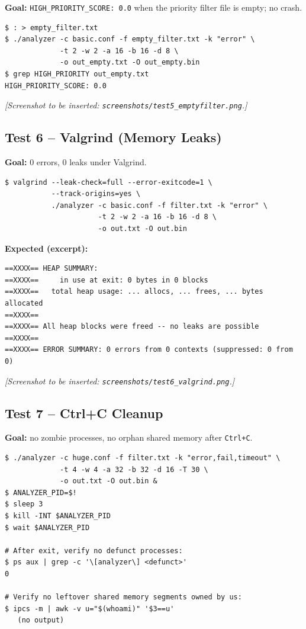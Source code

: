 \documentclass[11pt,a4paper]{article}
\newcommand{\code}[1]{\texttt{\small #1}}
\begin{document}
\textbf{Goal:} \code{HIGH\_PRIORITY\_SCORE: 0.0} when the priority
filter file is empty; no crash.

\begin{lstlisting}[style=Bashstyle]
$ : > empty_filter.txt
$ ./analyzer -c basic.conf -f empty_filter.txt -k "error" \
             -t 2 -w 2 -a 16 -b 16 -d 8 \
             -o out_empty.txt -O out_empty.bin
$ grep HIGH_PRIORITY out_empty.txt
HIGH_PRIORITY_SCORE: 0.0
\end{lstlisting}

\noindent
\textit{[Screenshot to be inserted: \code{screenshots/test5\_emptyfilter.png}.]}

\subsection{Test 6 -- Valgrind (Memory Leaks)}

\textbf{Goal:} 0 errors, 0 leaks under Valgrind.

\begin{lstlisting}[style=Bashstyle]
$ valgrind --leak-check=full --error-exitcode=1 \
           --track-origins=yes \
           ./analyzer -c basic.conf -f filter.txt -k "error" \
                      -t 2 -w 2 -a 16 -b 16 -d 8 \
                      -o out.txt -O out.bin
\end{lstlisting}

\textbf{Expected (excerpt):}
\begin{lstlisting}[style=Outputstyle]
==XXXX== HEAP SUMMARY:
==XXXX==     in use at exit: 0 bytes in 0 blocks
==XXXX==   total heap usage: ... allocs, ... frees, ... bytes allocated
==XXXX==
==XXXX== All heap blocks were freed -- no leaks are possible
==XXXX==
==XXXX== ERROR SUMMARY: 0 errors from 0 contexts (suppressed: 0 from 0)
\end{lstlisting}

\noindent
\textit{[Screenshot to be inserted: \code{screenshots/test6\_valgrind.png}.]}

\subsection{Test 7 -- Ctrl+C Cleanup}

\textbf{Goal:} no zombie processes, no orphan shared memory after
\code{Ctrl+C}.

\begin{lstlisting}[style=Bashstyle]
$ ./analyzer -c huge.conf -f filter.txt -k "error,fail,timeout" \
             -t 4 -w 4 -a 32 -b 32 -d 16 -T 30 \
             -o out.txt -O out.bin &
$ ANALYZER_PID=$!
$ sleep 3
$ kill -INT $ANALYZER_PID
$ wait $ANALYZER_PID

# After exit, verify no defunct processes:
$ ps aux | grep -c '\[analyzer\] <defunct>'
0

# Verify no leftover shared memory segments owned by us:
$ ipcs -m | awk -v u="$(whoami)" '$3==u'
   (no output)
\end{lstlisting}
\end{document}
